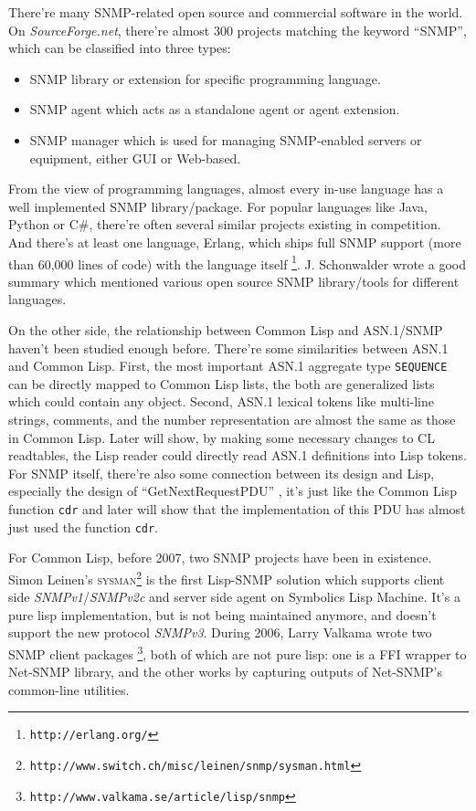 \documentclass[reprint,9pt]{sigplanconf}
\begin{document}
There're many SNMP-related open source and commercial software in the
world. On \textsl{SourceForge.net}, there're almost 300 projects
matching the keyword ``SNMP'', which can be classified into three
types:
\begin{itemize}
\item SNMP library or extension for specific programming language.
\item SNMP agent which acts as a standalone agent or agent extension.
\item SNMP manager which is used for managing SNMP-enabled servers or
  equipment, either GUI or Web-based.
\end{itemize}

From the view of programming languages, almost every in-use language
has a well implemented SNMP library/package. For popular languages
like Java, Python or C\#, there're often several similar projects
existing in competition. And there's at least one language, Erlang,
which ships full SNMP support (more than 60,000 lines of code) with
the language itself \footnote{\texttt{http://erlang.org/}}.
J. Schonwalder wrote a good summary \cite{Schonwalder2002}
which mentioned various open source SNMP library/tools for different languages.

On the other side, the relationship between Common Lisp and ASN.1/SNMP
haven't been studied enough before. There're some similarities between
ASN.1 and Common Lisp. First, the most important ASN.1 aggregate
type \texttt{SEQUENCE} can be directly mapped to Common Lisp lists,
the both are generalized lists which could contain any object. Second,
ASN.1 lexical tokens like multi-line strings, comments, and the number
representation are almost the same as those in Common Lisp. Later will show,
by making some necessary changes to CL readtables, the Lisp reader
could directly read ASN.1 definitions into Lisp tokens. For SNMP itself,
there're also some connection between its design and Lisp, especially the
design of ``GetNextRequestPDU'' \cite{RFC:3416},
it's just like the Common Lisp function
\texttt{cdr} and later will show that the implementation of this PDU has
almost just used the function \texttt{cdr}.

For Common Lisp, before 2007, two SNMP projects have been in
existence. Simon Leinen's
\textsc{sysman}\footnote{\texttt{http://www.switch.ch/misc/leinen/snmp/sysman.html}}
is the first Lisp-SNMP solution which supports client side
\textsl{SNMPv1}/\textsl{SNMPv2c} and server side agent on
Symbolics Lisp Machine. It's a pure lisp implementation, but
is not being maintained anymore, and doesn't support the new protocol \textsl{SNMPv3}.
During 2006, Larry Valkama wrote two SNMP client packages
\footnote{\texttt{http://www.valkama.se/article/lisp/snmp}},
both of which are not pure lisp:
one is a FFI wrapper to Net-SNMP library, and the other works
by capturing outputs of Net-SNMP's common-line utilities.
\end{document}
